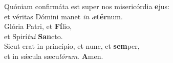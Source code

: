 \evenverse Quóniam confirmáta est super nos misericórdia \textbf{e}jus:~\*\\
\evenverse et véritas Dómini manet \textit{in} \textit{æ}\textbf{tér}num.\\
\oddverse Glória Patri, et \textbf{Fí}lio,~\*\\
\oddverse et Spirí\textit{tu}\textit{i} \textbf{San}cto.\\
\evenverse Sicut erat in princípio, et nunc, et \textbf{sem}per,~\*\\
\evenverse et in sǽcula sæcu\textit{ló}\textit{rum}. \textbf{A}men.\\
